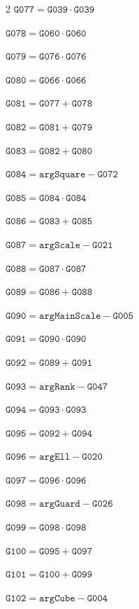 \documentclass[10pt]{article}
\begin{document}
\begin{multicols}{2}
\noindent $\mathtt{G077}=\mathtt{G039}\cdot \mathtt{G039}$\par
\noindent $\mathtt{G078}=\mathtt{G060}\cdot \mathtt{G060}$\par
\noindent $\mathtt{G079}=\mathtt{G076}\cdot \mathtt{G076}$\par
\noindent $\mathtt{G080}=\mathtt{G066}\cdot \mathtt{G066}$\par
\noindent $\mathtt{G081}=\mathtt{G077}+\mathtt{G078}$\par
\noindent $\mathtt{G082}=\mathtt{G081}+\mathtt{G079}$\par
\noindent $\mathtt{G083}=\mathtt{G082}+\mathtt{G080}$\par
\noindent $\mathtt{G084}=\mathtt{argSquare}-\mathtt{G072}$\par
\noindent $\mathtt{G085}=\mathtt{G084}\cdot \mathtt{G084}$\par
\noindent $\mathtt{G086}=\mathtt{G083}+\mathtt{G085}$\par
\noindent $\mathtt{G087}=\mathtt{argScale}-\mathtt{G021}$\par
\noindent $\mathtt{G088}=\mathtt{G087}\cdot \mathtt{G087}$\par
\noindent $\mathtt{G089}=\mathtt{G086}+\mathtt{G088}$\par
\noindent $\mathtt{G090}=\mathtt{argMainScale}-\mathtt{G005}$\par
\noindent $\mathtt{G091}=\mathtt{G090}\cdot \mathtt{G090}$\par
\noindent $\mathtt{G092}=\mathtt{G089}+\mathtt{G091}$\par
\noindent $\mathtt{G093}=\mathtt{argRank}-\mathtt{G047}$\par
\noindent $\mathtt{G094}=\mathtt{G093}\cdot \mathtt{G093}$\par
\noindent $\mathtt{G095}=\mathtt{G092}+\mathtt{G094}$\par
\noindent $\mathtt{G096}=\mathtt{argEll}-\mathtt{G020}$\par
\noindent $\mathtt{G097}=\mathtt{G096}\cdot \mathtt{G096}$\par
\noindent $\mathtt{G098}=\mathtt{argGuard}-\mathtt{G026}$\par
\noindent $\mathtt{G099}=\mathtt{G098}\cdot \mathtt{G098}$\par
\noindent $\mathtt{G100}=\mathtt{G095}+\mathtt{G097}$\par
\noindent $\mathtt{G101}=\mathtt{G100}+\mathtt{G099}$\par
\noindent $\mathtt{G102}=\mathtt{argCube}-\mathtt{G004}$\par

\end{multicols}
\end{document}

